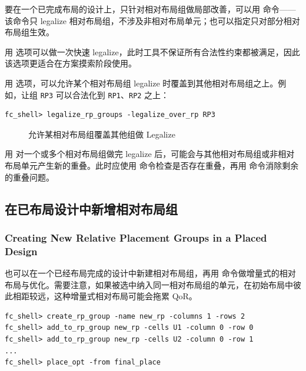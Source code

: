 要在一个已完成布局的设计上，只针对相对布局组做局部改善，可以用  命令——该命令只 legalize 相对布局组，不涉及非相对布局单元；也可以指定只对部分相对布局组生效。

用  选项可以做一次快速 legalize，此时工具不保证所有合法性约束都被满足，因此该选项更适合在方案摸索阶段使用。

用  选项，可以允许某个相对布局组 legalize 时覆盖到其他相对布局组之上。例如，让组 \texttt{RP3} 可以合法化到 \texttt{RP1}、\texttt{RP2} 之上：
\begin{lstlisting}
fc_shell> legalize_rp_groups -legalize_over_rp RP3
\end{lstlisting}

\begin{figure}[htbp]
\centering
{}
\caption{允许某相对布局组覆盖其他组做 Legalize}
\label{fig:rp-legalize-over}
\end{figure}

用  对一个或多个相对布局组做完 legalize 后，可能会与其他相对布局组或非相对布局单元产生新的重叠。此时应使用  命令检查是否存在重叠，再用  命令消除剩余的重叠问题。

\subsection{在已布局设计中新增相对布局组}
\subsubsection*{Creating New Relative Placement Groups in a Placed Design}

也可以在一个已经布局完成的设计中新建相对布局组，再用  命令做增量式的相对布局与优化。需要注意，如果被选中纳入同一相对布局组的单元，在初始布局中彼此相距较远，这种增量式相对布局可能会拖累 QoR。

\begin{lstlisting}
fc_shell> create_rp_group -name new_rp -columns 1 -rows 2
fc_shell> add_to_rp_group new_rp -cells U1 -column 0 -row 0
fc_shell> add_to_rp_group new_rp -cells U2 -column 0 -row 1
...
fc_shell> place_opt -from final_place
\end{lstlisting}


